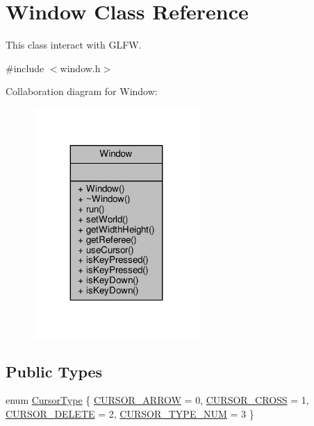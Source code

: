 \hypertarget{classWindow}{}\section{Window Class Reference}
\label{classWindow}


This class interact with G\+L\+F\+W.  




{\ttfamily \#include $<$window.\+h$>$}



Collaboration diagram for Window\+:\nopagebreak
\begin{figure}[H]
\begin{center}
\leavevmode
\includegraphics[width=179pt]{classWindow__coll__graph}
\end{center}
\end{figure}
\subsection*{Public Types}
\begin{DoxyCompactItemize}
\item 
enum \hyperlink{classWindow_a777c693a4c2b74e712839aa15189e07f}{Cursor\+Type} \{ \hyperlink{classWindow_a777c693a4c2b74e712839aa15189e07fadc371b755e3336f07c17227a754a829e}{C\+U\+R\+S\+O\+R\+\_\+\+A\+R\+R\+O\+W} = 0, 
\hyperlink{classWindow_a777c693a4c2b74e712839aa15189e07faf6561d7cc9ae11d29f3004c0f2ab33e3}{C\+U\+R\+S\+O\+R\+\_\+\+C\+R\+O\+S\+S} = 1, 
\hyperlink{classWindow_a777c693a4c2b74e712839aa15189e07fa2ed9ada326b2dfd626e2d2adcbd8691f}{C\+U\+R\+S\+O\+R\+\_\+\+D\+E\+L\+E\+T\+E} = 2, 
\hyperlink{classWindow_a777c693a4c2b74e712839aa15189e07fad4d3e8c6d4b72f1b918b63b0f18888d3}{C\+U\+R\+S\+O\+R\+\_\+\+T\+Y\+P\+E\+\_\+\+N\+U\+M} = 3
 \}
\end{DoxyCompactItemize}
